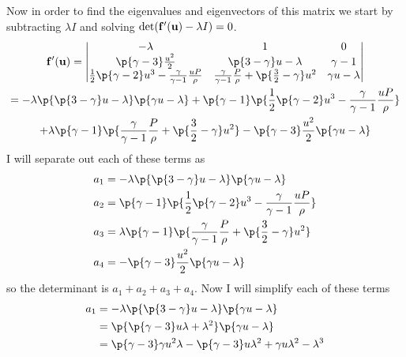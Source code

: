 \documentclass[11pt, oneside]{article}
\begin{document}
\begin{enumerate}
    Now in order to find the eigenvalues and eigenvectors of this matrix we
    start by subtracting $\lambda I$ and solving
    $\det(\mathbf{f}'(\mathbf{u}) - \lambda I) = 0$.
    \begin{gather*}
      \v{f}'(\v{u}) =
      \begin{vmatrix}
        -\lambda & 1 & 0 \\
        \p{\gamma - 3} \frac{u^2}{2} & \p{3 - \gamma}u - \lambda & \gamma - 1 \\
        \frac{1}{2}\p{\gamma - 2} u^3 - \frac{\gamma}{\gamma - 1}\frac{uP}{\rho} & \frac{\gamma}{\gamma - 1}\frac{P}{\rho} + \p{\frac{3}{2} - \gamma}u^2  & \gamma u - \lambda \\
      \end{vmatrix} \\
      = -\lambda \p{\p{3 - \gamma}u - \lambda} \p{\gamma u - \lambda} + \p{\gamma - 1}\p{\frac{1}{2}\p{\gamma - 2} u^3 - \frac{\gamma}{\gamma - 1}\frac{uP}{\rho}} \\
      + \lambda \p{\gamma - 1} \p{\frac{\gamma}{\gamma - 1}\frac{P}{\rho} + \p{\frac{3}{2} - \gamma}u^2} - \p{\gamma - 3} \frac{u^2}{2}\p{\gamma u - \lambda}
    \end{gather*}
    I will separate out each of these terms as
    \begin{align*}
      a_1 &= -\lambda \p{\p{3 - \gamma}u - \lambda} \p{\gamma u - \lambda} \\
      a_2 &= \p{\gamma - 1}\p{\frac{1}{2}\p{\gamma - 2} u^3 - \frac{\gamma}{\gamma - 1}\frac{uP}{\rho}} \\
      a_3 &= \lambda \p{\gamma - 1} \p{\frac{\gamma}{\gamma - 1}\frac{P}{\rho} + \p{\frac{3}{2} - \gamma}u^2} \\
      a_4 &= -\p{\gamma - 3} \frac{u^2}{2}\p{\gamma u - \lambda}
    \end{align*}
    so the determinant is $a_1 + a_2 + a_3 + a_4$.
    Now I will simplify each of these terms
    \begin{align*}
      a_1 &=  -\lambda \p{\p{3 - \gamma}u - \lambda} \p{\gamma u - \lambda} \\
      &= \p{\p{\gamma - 3}u\lambda + \lambda^2} \p{\gamma u - \lambda} \\
      &= \p{\gamma - 3}\gamma u^2 \lambda - \p{\gamma - 3} u\lambda^2 + \gamma u \lambda^2 - \lambda^3 \\

\end{align*}
\end{enumerate}
\end{document}
